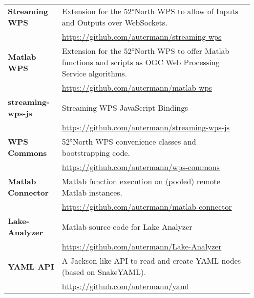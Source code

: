 	\begin{tabularx}{\textwidth}{@{}lX@{}}
		\toprule

		\textbf{Streaming WPS}
		& Extension for the 52°North WPS to allow of Inputs and Outputs over WebSockets.\\
		& \url{https://github.com/autermann/streaming-wps} \\
		\cmidrule(r){1-1}
		\cmidrule(l){2-2}

		\textbf{Matlab WPS}
		& Extension for the 52°North WPS to offer Matlab functions and scripts as OGC Web Processing Service algorithms.\\
		& \url{https://github.com/autermann/matlab-wps}\\
		\cmidrule(r){1-1}
		\cmidrule(l){2-2}

		\textbf{streaming-wps-js}
		& Streaming WPS JavaScript Bindings\\
		& \url{https://github.com/autermann/streaming-wps-js}\\
		\cmidrule(r){1-1}
		\cmidrule(l){2-2}

		\textbf{WPS Commons}
		& 52°North WPS convenience classes and bootstrapping code.\\
		& \url{https://github.com/autermann/wps-commons}\\
		\cmidrule(r){1-1}
		\cmidrule(l){2-2}

		\textbf{Matlab Connector}
		& Matlab function execution on (pooled) remote Matlab instances.\\
		& \url{https://github.com/autermann/matlab-connector}\\
		\cmidrule(r){1-1}
		\cmidrule(l){2-2}

		\textbf{Lake-Analyzer}
		& Matlab source code for Lake Analyzer\\
		& \url{https://github.com/autermann/Lake-Analyzer}\\
		\cmidrule(r){1-1}
		\cmidrule(l){2-2}

		\textbf{YAML API}
		& A Jackson-like API to read and create YAML nodes (based on SnakeYAML).\\
		& \url{https://github.com/autermann/yaml}\\
		\bottomrule
	\end{tabularx}

